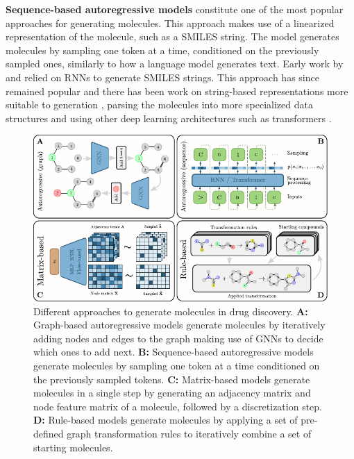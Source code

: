 \textbf{Sequence-based autoregressive models} constitute one of the most popular approaches for
generating molecules. This approach makes use of a linearized representation of the molecule, such
as a SMILES string. The model generates molecules by sampling one token at a time,
conditioned on the previously sampled ones, similarly to how a language model generates text.
Early work by \citep{seglerGeneratingFocusedMolecule2018} and
\citep{gomez-bombarelliAutomaticChemicalDesign2018} relied on \acp{RNN} to
generate SMILES strings. This approach has since remained popular and there has been work on
string-based representations more suitable to generation
\citep{oboyleDeepSMILESAdaptationSMILES2018,krennSelfReferencingEmbeddedStrings2020,noutahiGottaBeSAFE2023},
parsing the molecules into more specialized data structures
\citep{kusnerGrammarVariationalAutoencoder2017,jinJunctionTreeVariational2018} and using other deep
learning architectures such as transformers
\citep{vaswaniAttentionAllYou2017,noutahiGottaBeSAFE2023,schwallerMolecularTransformerModel2019,bagalMolGPTMolecularGeneration2022,mazuzMoleculeGenerationUsing2023}.

\begin{figure}
      \centering
      \includegraphics[width=\textwidth]{figures/generation_strategies_tryout.pdf}
      \caption{Different approaches to generate molecules in drug discovery. \textbf{A:} Graph-based
            autoregressive models generate molecules by iteratively adding nodes and edges to the
            graph making use of \acp{GNN} to decide which ones to add next. \textbf{B:}
            Sequence-based autoregressive models generate molecules by sampling one token at a time
            conditioned on the previously sampled tokens. \textbf{C:} Matrix-based models generate
            molecules in a single step by generating an adjacency matrix and node feature matrix of
            a molecule, followed by a discretization step. \textbf{D:} Rule-based models generate
            molecules by applying a set of pre-defined graph transformation rules to iteratively
            combine a set of starting molecules. \label{fig:generation-strategies}}
\end{figure}

